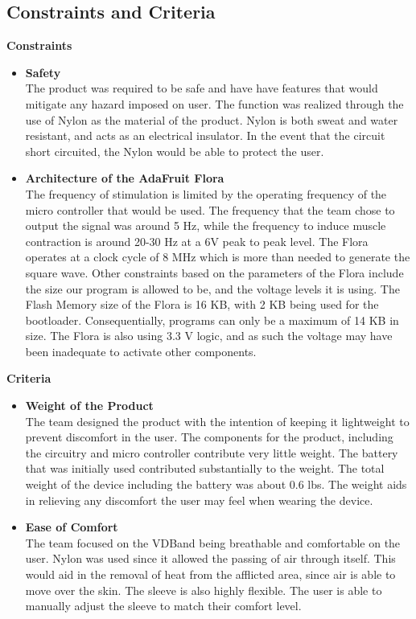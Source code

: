 \documentclass[11.5pt]{article}
\begin{document}
\subsection{Constraints and Criteria}
\textbf{Constraints}
\begin{itemize}
\item  \textbf{Safety}\\
The product was required to be safe and have have features that would mitigate any hazard imposed on user. The function was realized through the use of Nylon as the material of the product. Nylon is both sweat and water resistant, and acts as an electrical insulator. In the event that the circuit short circuited, the Nylon would be able to protect the user. 

\item \textbf{Architecture of the AdaFruit Flora}\\
The frequency of stimulation is limited by the operating frequency of the  micro controller that would be used. The frequency that the team chose to output the signal was around 5 Hz, while the frequency to induce muscle contraction is around 20-30 Hz at a 6V peak to peak level. The Flora operates at a clock cycle of 8 MHz which is more than needed to generate the square wave. Other constraints based on the parameters of the Flora include the size our program is allowed to be, and the voltage levels it is using. The Flash Memory size of the Flora is 16 KB, with 2 KB being used for the bootloader. Consequentially, programs can only be a maximum of 14 KB in size. The Flora is also using 3.3 V logic, and as such the voltage may have been inadequate to activate other components. 
\end{itemize}

\textbf{Criteria}
\begin{itemize}
\item \textbf{Weight of the Product}\\
The team designed the product with the intention of keeping it lightweight to prevent discomfort in the user. The components for the product, including the circuitry and micro controller contribute very little weight. The battery that was initially used contributed substantially to the weight. The total weight of the device including the battery was about 0.6 lbs. The weight aids in relieving any discomfort the user may feel when wearing the device. 

\item \textbf{Ease of Comfort}\\
The team focused on the VDBand being breathable and comfortable on the user. Nylon was used since it allowed the passing of air through itself. This would aid in the removal of heat from the afflicted area, since air is able to move over the skin. The sleeve is also highly flexible. The user is able to manually adjust the sleeve to match their comfort level. 

\end{itemize}
\end{document}
